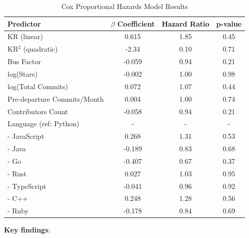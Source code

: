 \documentclass[11pt,letterpaper]{article}
\begin{document}
\begin{table}[!htbp]
\centering
\caption{Cox Proportional Hazards Model Results}
\label{tab:cox_results}
\begin{tabular}{lccc}
\toprule
\textbf{Predictor} & $\beta$ \textbf{Coefficient} & \textbf{Hazard Ratio} & \textbf{p-value} \\
\midrule
KR (linear) & 0.615 & 1.85 & 0.45 \\
KR$^2$ (quadratic) & -2.34 & 0.10 & 0.71 \\
Bus Factor & -0.059 & 0.94 & 0.21 \\
log(Stars) & -0.002 & 1.00 & 0.98 \\
log(Total Commits) & 0.072 & 1.07 & 0.44 \\
Pre-departure Commits/Month & 0.004 & 1.00 & 0.74 \\
Contributors Count & -0.058 & 0.94 & 0.21 \\
Language (ref: Python) & - & - & - \\
- JavaScript & 0.268 & 1.31 & 0.53 \\
- Java & -0.189 & 0.83 & 0.68 \\
- Go & -0.407 & 0.67 & 0.37 \\
- Rust & 0.027 & 1.03 & 0.95 \\
- TypeScript & -0.041 & 0.96 & 0.92 \\
- C++ & 0.248 & 1.28 & 0.56 \\
- Ruby & -0.178 & 0.84 & 0.69 \\
\bottomrule
\end{tabular}
\end{table}

\textbf{Key findings}:
\end{document}
